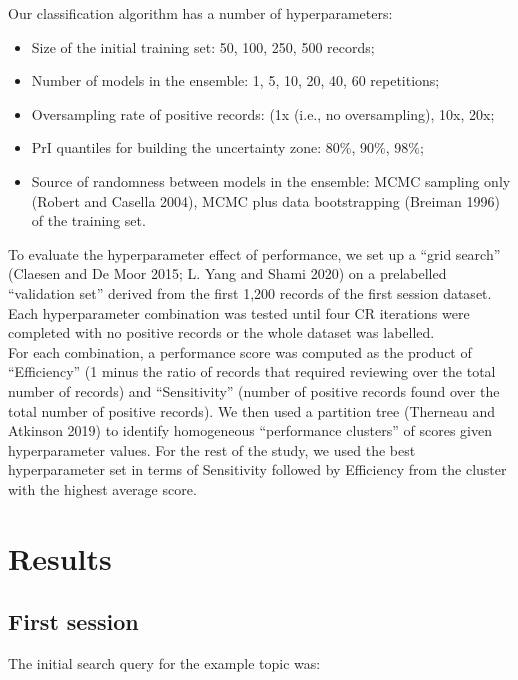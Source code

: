\documentclass{article}
\providecommand{\tightlist}{%
  \setlength{\itemsep}{0pt}\setlength{\parskip}{0pt}}
\begin{document}
Our classification algorithm has a number of hyperparameters:

\begin{itemize}
\tightlist
\item
  Size of the initial training set: 50, 100, 250, 500 records;
\item
  Number of models in the ensemble: 1, 5, 10, 20, 40, 60 repetitions;
\item
  Oversampling rate of positive records: (1x (i.e., no oversampling),
  10x, 20x;
\item
  PrI quantiles for building the uncertainty zone: 80\%, 90\%, 98\%;
\item
  Source of randomness between models in the ensemble: MCMC sampling
  only (Robert and Casella 2004), MCMC plus data bootstrapping (Breiman
  1996) of the training set.
\end{itemize}

To evaluate the hyperparameter effect of performance, we set up a ``grid
search'' (Claesen and De Moor 2015; L. Yang and Shami 2020) on a
prelabelled ``validation set'' derived from the first 1,200 records of
the first session dataset. Each hyperparameter combination was tested
until four CR iterations were completed with no positive records or the
whole dataset was labelled.\\
For each combination, a performance score was computed as the product of
``Efficiency'' (1 minus the ratio of records that required reviewing
over the total number of records) and ``Sensitivity'' (number of
positive records found over the total number of positive records). We
then used a partition tree (Therneau and Atkinson 2019) to identify
homogeneous ``performance clusters'' of scores given hyperparameter
values. For the rest of the study, we used the best hyperparameter set
in terms of Sensitivity followed by Efficiency from the cluster with the
highest average score.\\

\hypertarget{results}{%
\section{Results}\label{results}}

\hypertarget{first-session}{%
\subsection{First session}\label{first-session}}

The initial search query for the example topic was:\\
\end{document}
